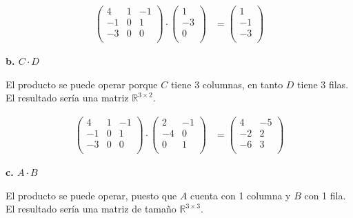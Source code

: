 \documentclass[11pt]{article}
\begin{document}
\begin{align*}
  \begin{pmatrix}
    4  & 1 & -1 \\
    -1 & 0 & 1  \\
    -3 & 0 & 0  \\
  \end{pmatrix}
  \cdot
  \begin{pmatrix}
    1  \\
    -3 \\
    0  \\
  \end{pmatrix}
   & =
  \boxed{
    \begin{pmatrix}
      1  \\
      -1 \\
      -3 \\
    \end{pmatrix}
  }
\end{align*}

\textbf{b. \(C \cdot D\)}

El producto se puede operar porque \(C\) tiene 3 columnas,
en tanto \(D\) tiene 3 filas.
El resultado sería una matriz \(\mathbb{R}^{3 \times 2}\).

\begin{align*}
  \begin{pmatrix}
    4  & 1 & -1 \\
    -1 & 0 & 1  \\
    -3 & 0 & 0  \\
  \end{pmatrix}
  \cdot
  \begin{pmatrix}
    2  & -1 \\
    -4 & 0  \\
    0  & 1  \\
  \end{pmatrix}
   & =
  \boxed{
    \begin{pmatrix}
      4  & -5 \\
      -2 & 2  \\
      -6 & 3  \\
    \end{pmatrix}
  }
\end{align*}

\textbf{c. \(A \cdot B\)}

El producto se puede operar,
puesto que \(A\) cuenta con 1 columna y \(B\) con 1 fila.
El resultado sería una matriz de tamaño \(\mathbb{R}^{3 \times 3}\).
\end{document}
